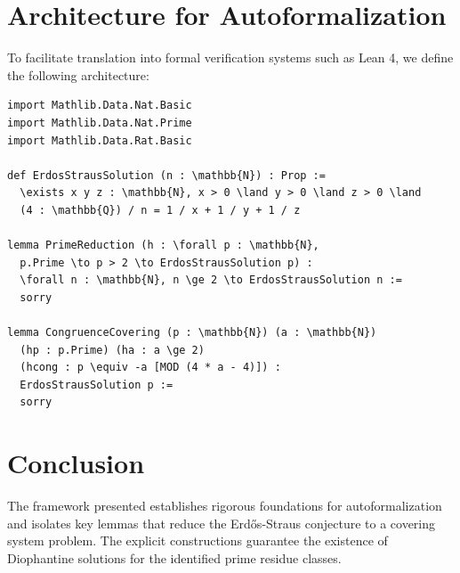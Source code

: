\documentclass[12pt,a4paper]{article}
\begin{document}
\section{Architecture for Autoformalization}

To facilitate translation into formal verification systems such as Lean 4, we define the following architecture:

\begin{verbatim}
import Mathlib.Data.Nat.Basic
import Mathlib.Data.Nat.Prime
import Mathlib.Data.Rat.Basic

def ErdosStrausSolution (n : \mathbb{N}) : Prop :=
  \exists x y z : \mathbb{N}, x > 0 \land y > 0 \land z > 0 \land
  (4 : \mathbb{Q}) / n = 1 / x + 1 / y + 1 / z

lemma PrimeReduction (h : \forall p : \mathbb{N},
  p.Prime \to p > 2 \to ErdosStrausSolution p) :
  \forall n : \mathbb{N}, n \ge 2 \to ErdosStrausSolution n :=
  sorry

lemma CongruenceCovering (p : \mathbb{N}) (a : \mathbb{N})
  (hp : p.Prime) (ha : a \ge 2)
  (hcong : p \equiv -a [MOD (4 * a - 4)]) :
  ErdosStrausSolution p :=
  sorry
\end{verbatim}

\section{Conclusion}
The framework presented establishes rigorous foundations for autoformalization and isolates key lemmas that reduce the Erd\H{o}s-Straus conjecture to a covering system problem. The explicit constructions guarantee the existence of Diophantine solutions for the identified prime residue classes.
\end{document}
